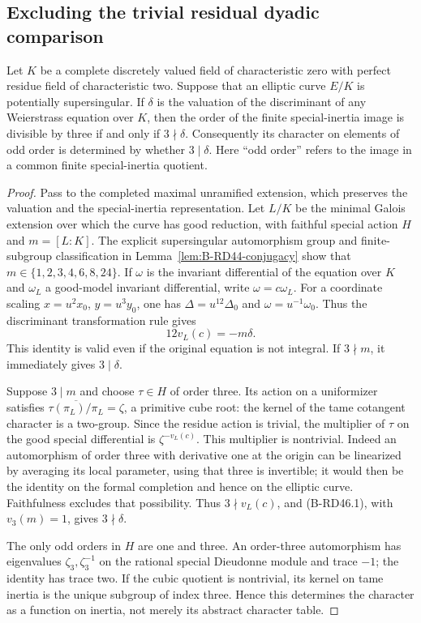 \subsection{Excluding the trivial residual dyadic comparison}

\begin{lemma}
\label{lem:B-RD46-discriminant}
Let $K$ be a complete discretely valued field of characteristic zero
with perfect residue field of characteristic two. Suppose that an
elliptic curve $E/K$ is potentially supersingular. If $\delta$ is the
valuation of the discriminant of any Weierstrass equation over $K$,
then the order of the finite special-inertia image is divisible by
three if and only if $3\nmid\delta$. Consequently its character on
elements of odd order is determined by whether $3\mid\delta$.
Here ``odd order'' refers to the image in a common finite
special-inertia quotient.
\end{lemma}
\begin{proof}
Pass to the completed maximal unramified extension, which preserves
the valuation and the special-inertia representation. Let $L/K$ be
the minimal Galois extension over which the curve has good reduction,
with faithful special action $H$ and $m=[L:K]$. The explicit
supersingular automorphism group and finite-subgroup classification
in Lemma~\ref{lem:B-RD44-conjugacy} show that
$m\in\{1,2,3,4,6,8,24\}$.
If $\omega$ is the invariant differential of the equation over $K$
and $\omega_L$ a good-model invariant differential, write
$\omega=c\omega_L$. For a coordinate scaling $x=u^2x_0$, $y=u^3y_0$, one has
$\Delta=u^{12}\Delta_0$ and $\omega=u^{-1}\omega_0$.
Thus the discriminant transformation rule gives
\[
                         12v_L(c)=-m\delta.             \tag{B-RD46.1}
\]
This identity is valid even if the original equation is not integral.
If $3\nmid m$, it immediately gives $3\mid\delta$.

Suppose $3\mid m$ and choose $\tau\in H$ of order three.
Its action on a uniformizer satisfies
$\overline{\tau(\pi_L)/\pi_L}=\zeta$, a primitive cube root:
the kernel of the tame cotangent character is a two-group.
Since the residue action is trivial, the multiplier of $\tau$ on
the good special differential is $\zeta^{-v_L(c)}$.
This multiplier is nontrivial. Indeed an automorphism of order
three with derivative one at the origin can be linearized by
averaging its local parameter, using that three is invertible;
it would then be the identity on the formal completion and hence
on the elliptic curve. Faithfulness excludes that possibility.
Thus $3\nmid v_L(c)$, and (B-RD46.1), with $v_3(m)=1$, gives
$3\nmid\delta$.

The only odd orders in $H$ are one and three. An order-three
automorphism has eigenvalues $\zeta_3,\zeta_3^{-1}$ on the
rational special Dieudonne module and trace $-1$; the identity
has trace two. If the cubic quotient is nontrivial, its kernel
on tame inertia is the unique subgroup of index three.
Hence this determines the character as a function on inertia,
not merely its abstract character table.
\end{proof}

